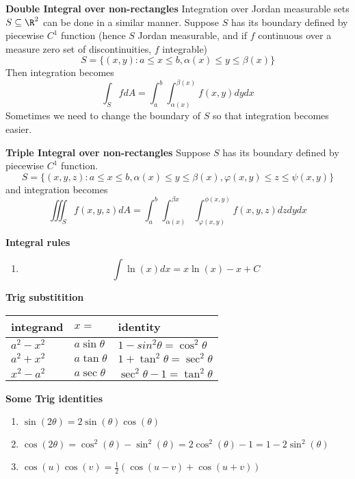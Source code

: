 \documentclass[11pt]{article}
\begin{document}
\begin{defn*}
  \textbf{Double Integral over non-rectangles}
    Integration over Jordan measurable sets $S\subseteq \R^2$ can be done in a similar manner. Suppose $S$ has its boundary defined by piecewise $C^1$ function (hence $S$ Jordan measurable, and if $f$ continuous over a measure zero set of discontinuities, $f$ integrable)
    \[
      S = \{ (x,y): a \leq x \leq b, \alpha(x)\leq y \leq \beta(x)\}
    \]
    Then integration becomes
    \[
      \int_S f dA = \int_a^b \int_{\alpha(x)}^{\beta(x)} f(x,y) dy dx
    \]
    Sometimes we need to change the boundary of $S$ so that integration becomes easier.
\end{defn*}

\begin{defn*}
  \textbf{Triple Integral over non-rectangles} Suppose $S$ has its boundary defined by piecewise $C^1$ function.
  \[
    S = \{ (x,y,z): a \leq x \leq b, \alpha(x)\leq y\leq \beta(x), \varphi(x,y)\leq z\leq \psi(x,y) \}
  \]
  and integration becomes
  \[
    \iiint_S f(x,y,z) dA = \int_a^b \int_{\alpha(x)}^{\beta{x}} \int_{\varphi(x,y)}^{\phi(x,y)} f(x,y,z) dz dy dx
  \]
\end{defn*}


\textbf{Integral rules}
\begin{enumerate}
  \item
  \[
    \int \ln(x)dx = x \ln (x) - x + C
  \]
\end{enumerate}

\begin{defn*}
  \textbf{Trig substitition} \\
  \begin{tabular}{l l l}
    integrand & $x=$ & identity\\
    \hline
    $a^2 - x^2$ & $a\sin \theta$ & $1-sin^2\theta = \cos^2 \theta$\\
    $a^2 + x^2$ & $a\tan\theta$ & $1 + \tan^2 \theta = \sec^2 \theta$\\
    $x^2 - a^2$ & $a\sec \theta$ & $\sec^2 \theta - 1 = \tan^2 \theta$\\

  \end{tabular}
\end{defn*}

\begin{defn*}
  \textbf{Some Trig identities}\\
  \begin{enumerate}
    \item $\sin(2\theta) = 2\sin(\theta)\cos(\theta)$
    \item $\cos(2\theta) = \cos^2(\theta) - \sin^2(\theta) = 2\cos^2(\theta) - 1 = 1 - 2\sin^2(\theta)$
    \item $\cos(u)\cos(v) = \frac{1}{2}\left( \cos(u-v) + \cos(u+v) \right) $
  \end{enumerate}
\end{defn*}
\end{document}
